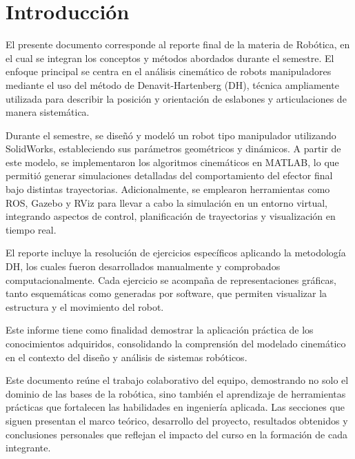 \chapter{Introducción} \label{chap:introduccion}

El presente documento corresponde al reporte final de la materia de Robótica, en el cual se integran los conceptos y métodos abordados durante el semestre. El enfoque principal se centra en el análisis cinemático de robots manipuladores mediante el uso del método de Denavit-Hartenberg (DH), técnica ampliamente utilizada para describir la posición y orientación de eslabones y articulaciones de manera sistemática.

Durante el semestre, se diseñó y modeló un robot tipo manipulador utilizando SolidWorks, estableciendo sus parámetros geométricos y dinámicos. A partir de este modelo, se implementaron los algoritmos cinemáticos en MATLAB, lo que permitió generar simulaciones detalladas del comportamiento del efector final bajo distintas trayectorias. Adicionalmente, se emplearon herramientas como ROS, Gazebo y RViz para llevar a cabo la simulación en un entorno virtual, integrando aspectos de control, planificación de trayectorias y visualización en tiempo real.

El reporte incluye la resolución de ejercicios específicos aplicando la metodología DH, los cuales fueron desarrollados manualmente y comprobados computacionalmente. Cada ejercicio se acompaña de representaciones gráficas, tanto esquemáticas como generadas por software, que permiten visualizar la estructura y el movimiento del robot.

Este informe tiene como finalidad demostrar la aplicación práctica de los conocimientos adquiridos, consolidando la comprensión del modelado cinemático en el contexto del diseño y análisis de sistemas robóticos.


Este documento reúne el trabajo colaborativo del equipo, demostrando no solo el dominio de las bases de la robótica, sino también el aprendizaje de herramientas prácticas que fortalecen las habilidades en ingeniería aplicada. Las secciones que siguen presentan el marco teórico, desarrollo del proyecto, resultados obtenidos y conclusiones personales que reflejan el impacto del curso en la formación de cada integrante.